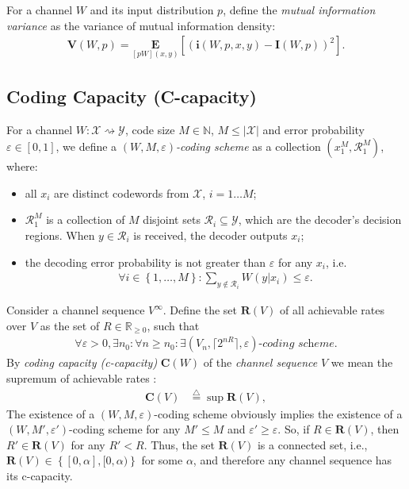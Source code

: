 \documentclass[journal, twocol]{IEEEtran}
\newcommand{\bfi}{{\mathbf{i}}}
\newcommand{\bfC}{{\mathbf{C}}}
\newcommand{\bfE}{{\mathbf{E}}}
\newcommand{\bfI}{{\mathbf{I}}}
\newcommand{\bN}{{\mathbb{N}}}
\newcommand{\bR}{{\mathbb{R}}}
\newcommand{\bfR}{{\mathbf{R}}}
\newcommand{\mR}{{\mathcal{R}}}
\newcommand{\bfV}{{\mathbf{V}}}
\newcommand{\mX}{{\mathcal{X}}}
\newcommand{\mY}{{\mathcal{Y}}}
\newcommand{\set}[1]{{\left\{{#1}\right\}}}
\newcommand{\br}[1]{{\left({#1}\right)}}
\newcommand{\brsq}[1]{{\left[{#1}\right]}}
\newcommand{\ceil}[1]{\lceil{{#1}\rceil}}
\newcommand{\ve}{\varepsilon}
\newcommand{\tosq}{\rightsquigarrow}
\newcommand{\pW}[2]{[{#1}{#2}]}
\begin{document}
For a channel $W$ and its input distribution $p$, define the \emph{mutual information variance} as the variance of mutual information density:
\begin{align}
\bfV(W,p)=\underset{\pW{p}{W}(x,y)}{\bfE}\brsq{\br{\bfi(W,p,x,y)-\bfI(W,p)}^2}.
\label{eq:vardef}
\end{align}

\subsection{Coding Capacity (C-capacity)}

For a channel $W:\mX\tosq \mY$, code size $M\in\bN$, $M\leq |\mX|$ and error probability $\ve\in[0,1]$, we define a \emph{$(W, M, \ve)$-coding scheme} as a collection $(x_1^M, \mR_1^M)$, where:
\begin{itemize}	
	\item all $x_i$ are distinct codewords from $\mX$, $i=1\dots M$;
	\item $\mR_1^M$ is a collection of $M$ disjoint sets $\mR_i\subseteq \mY$, which are the decoder's decision regions. When $y\in\mR_i$ is received, the decoder outputs $x_i$;
	\item the decoding error probability is not greater than $\ve$ for any $x_i$, i.e.
\begin{align}
	\forall i\in\set{1,\dots,M}: \sum_{y\notin\mR_i}{W(y|x_i)}\leq \ve.
\label{eq:decerr}
\end{align}
\end{itemize}

Consider a channel sequence $V^\infty$.
Define the set $\bfR(V)$ of all achievable rates over $V$ as the set of $R\in\bR_{\geq 0}$, such that
\begin{align}
\forall \ve>0, \exists n_0:\forall n\geq n_0: \exists (V_n, \ceil{2^{nR}}, \ve)\textit{-coding scheme}.
\label{eq:ar}
\end{align}
By \textit{coding capacity (c-capacity)} $\bfC(W)$ of the \emph{channel sequence} $V$ we mean the supremum of achievable rates \cite{dobrushin67shannons}:
\begin{align}
\bfC(V)&\stackrel{\triangle}{=}\sup\bfR(V),
\label{eq:cdef}
\end{align}
The existence of a $(W,M,\ve)$-coding scheme obviously implies the existence of a $(W,M',\ve')$-coding scheme for any $M'\leq M$ and $\ve'\geq\ve$.
So, if $R\in\bfR(V)$, then $R'\in\bfR(V)$ for any $R'<R$.
Thus, the set $\bfR(V)$ is a connected set, i.e., $\bfR(V)\in\set{[0,\alpha], [0,\alpha)}$ for some $\alpha$,
and therefore any channel sequence has its c-capacity.
\end{document}
